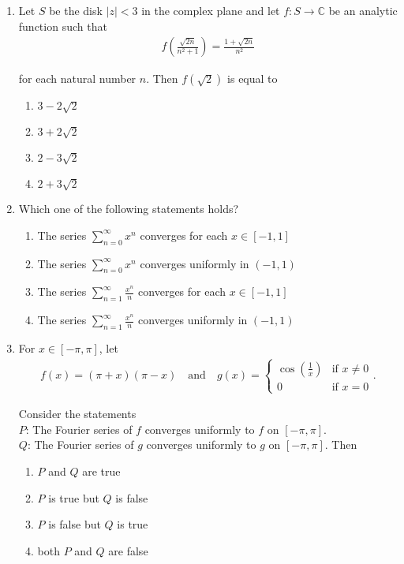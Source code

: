\documentclass[journal]{IEEEtran}
\numberwithin{equation}{enumi}
\numberwithin{figure}{enumi}
\begin{document}
\begin{enumerate}
\item
Let $S$ be the disk $|z| < 3$ in the complex plane and let $f:S \to \mathbb{C}$ be an analytic function such that
\begin{align}
    f\left(\frac{\sqrt{2n}}{n^2+1}\right) = \frac{1+\sqrt{2n}}{n^2}
\end{align}

for each natural number $n$. Then $f(\sqrt{2})$ is equal to
\hfill{}
\begin{multicols}{4}
\begin{enumerate}
    \item $3 - 2\sqrt{2}$
    \item $3 + 2\sqrt{2}$
    \item $2 - 3\sqrt{2}$
    \item $2 + 3\sqrt{2}$
\end{enumerate}
\end{multicols}


\item
Which one of the following statements holds?
\hfill{}
\begin{enumerate}
    \item The series $\sum_{n=0}^{\infty} x^n$ converges for each $x \in [-1,1]$
    \item The series $\sum_{n=0}^{\infty} x^n$ converges uniformly in $(-1,1)$
    \item The series $\sum_{n=1}^{\infty} \frac{x^n}{n}$ converges for each $x \in [-1,1]$
    \item The series $\sum_{n=1}^{\infty} \frac{x^n}{n}$ converges uniformly in $(-1,1)$
\end{enumerate}

\item
For $x \in [-\pi, \pi]$, let
\begin{align}
    f(x) = (\pi + x)(\pi - x) \quad \text{and} \quad 
g(x) = 
\begin{cases}
\cos\left(\frac{1}{x}\right) & \text{if } x \neq 0 \\
0 & \text{if } x = 0
\end{cases}.
\end{align}

Consider the statements\\
$P$: The Fourier series of $f$ converges uniformly to $f$ on $[-\pi, \pi]$.\\
$Q$: The Fourier series of $g$ converges uniformly to $g$ on $[-\pi, \pi]$. Then
\hfill{}
\begin{multicols}{2}
\begin{enumerate}
    \item $P$ and $Q$ are true
    \item $P$ is true but $Q$ is false
    \item $P$ is false but $Q$ is true
    \item both $P$ and $Q$ are false
\end{enumerate}
\end{multicols}



\end{enumerate}
\end{document}
